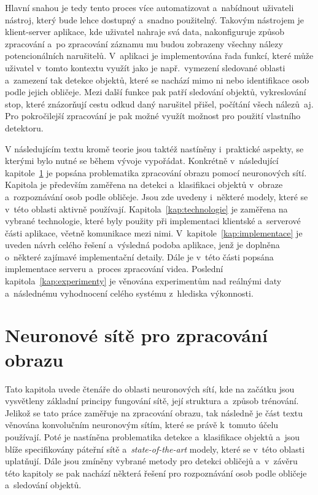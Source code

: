 Hlavní snahou je tedy tento proces více automatizovat a~nabídnout uživateli nástroj, který bude lehce dostupný a~snadno použitelný. Takovým nástrojem je klient-server aplikace, kde uživatel nahraje svá data, nakonfiguruje způsob zpracování a~po zpracování záznamu mu budou zobrazeny všechny nálezy potencionálních narušitelů. V~aplikaci je implementována řada funkcí, které může uživatel v~tomto kontextu využít jako je např.~vymezení sledované oblasti a~zamezení tak detekce objektů, které se nachází mimo ni nebo identifikace osob podle jejich obličeje. Mezi další funkce pak patří sledování objektů, vykreslování stop, které znázorňují cestu odkud daný narušitel přišel, počítání všech nálezů~aj. Pro pokročilejší zpracování je pak možné využít možnost pro použití vlastního detektoru.

V následujícím textu kromě teorie jsou taktéž nastíněny i~praktické aspekty, se kterými bylo nutné se během vývoje vypořádat. Konkrétně v~následující kapitole~\ref{kap:teorie} je popsána problematika zpracování obrazu pomocí neuronových sítí. Kapitola je především zaměřena na detekci a~klasifikaci objektů v~obraze a~rozpoznávání osob podle obličeje. Jsou zde uvedeny i~některé modely, které se v~této oblasti aktivně používají. Kapitola~\ref{kap:technologie} je zaměřena na vybrané technologie, které byly použity při implementaci klientské a~serverové části aplikace, včetně komunikace mezi nimi. V~kapitole~\ref{kap:implementace} je uveden návrh celého řešení a~výsledná podoba aplikace, jenž je doplněna o~některé zajímavé implementační detaily. Dále je v~této části popsána implementace serveru a~proces zpracování videa. Poslední kapitola~\ref{kap:experimenty} je věnována experimentům nad reálnými daty a~následnému vyhodnocení celého systému z~hlediska výkonnosti.


\chapter{Neuronové sítě pro zpracování obrazu}
\label{kap:teorie}
Tato kapitola uvede čtenáře do oblasti neuronových sítí, kde na začátku jsou vysvětleny základní principy fungování sítě, její struktura a~způsob trénování. Jelikož se tato práce zaměřuje na zpracování obrazu, tak následně je část textu věnována konvolučním neuronovým sítím, které se právě k~tomuto účelu používají. Poté je nastíněna problematika detekce a~klasifikace objektů a~jsou blíže specifikovány páteřní sítě a~\emph{state-of-the-art} modely, které se v~této oblasti uplatňují. Dále jsou zmíněny vybrané metody pro detekci obličejů a~v~závěru této kapitoly se pak nachází některá řešení pro rozpoznávání osob podle obličeje a~sledování objektů.

